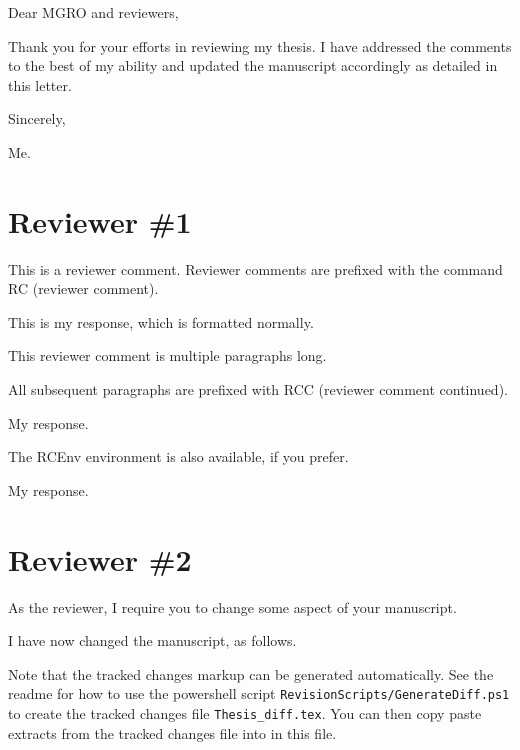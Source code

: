 \documentclass{AuthorResponse}
\newcommand{\arMatchCitationNumbers}{}
\begin{document}
\pagestyle{arPageStyle}
\thispagestyle{arPageStyleFirst}
\arLegend
\arMatchCitationNumbers

Dear MGRO and reviewers,

Thank you for your efforts in reviewing my thesis. I have addressed the comments to the best of my ability and updated the manuscript accordingly as detailed in this letter.

Sincerely,

Me.

\section{Reviewer \#1}
\RC This is a reviewer comment. Reviewer comments are prefixed with the command RC (reviewer comment). 

This is my response, which is formatted normally.

\RC This reviewer comment is multiple paragraphs long.

\RCC All subsequent paragraphs are prefixed with RCC (reviewer comment continued). 

My response.


\begin{RCEnv}
	The RCEnv environment is also available, if you prefer.
\end{RCEnv}

My response.


\section{Reviewer \#2}
\RC As the reviewer, I require you to change some aspect of your manuscript.

I have now changed the manuscript, as follows.

Note that the tracked changes markup can be generated automatically. See the readme for how to use the powershell script \verb|RevisionScripts/GenerateDiff.ps1| to create the tracked changes file \verb|Thesis_diff.tex|. You can then copy paste extracts from the tracked changes file into in this file.
\end{document}
